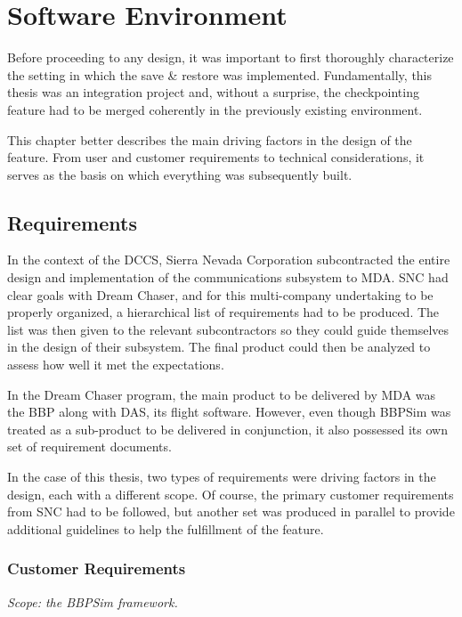 {
\setlength{\parindent}{2em}
\chapter{Software Environment}\label{cha:sim-env}
Before proceeding to any design, it was important to first thoroughly characterize the setting in which the save \& restore was implemented. Fundamentally, this thesis was an integration project and, without a surprise, the checkpointing feature had to be merged coherently in the previously existing environment.

This chapter better describes the main driving factors in the design of the feature. From user and customer requirements to technical considerations, it serves as the basis on which everything was subsequently built.

\section{Requirements}
In the context of the \gls{DCCS}, Sierra Nevada Corporation subcontracted the entire design and implementation of the communications subsystem to \gls{MDA}. \gls{SNC} had clear goals with Dream Chaser, and for this multi-company undertaking to be properly organized, a hierarchical list of requirements had to be produced. The list was then given to the relevant subcontractors so they could guide themselves in the design of their subsystem. The final product could then be analyzed to assess how well it met the expectations. 

In the Dream Chaser program, the main product to be delivered by \gls{MDA} was the \gls{BBP} along with \gls{DAS}, its flight software. However, even though \gls{BBPSim} was treated as a sub-product to be delivered in conjunction, it also possessed its own set of requirement documents.

In the case of this thesis, two types of requirements were driving factors in the design, each with a different scope. Of course, the primary customer requirements from \gls{SNC} had to be followed, but another set was produced in parallel to provide additional guidelines to help the fulfillment of the feature.  

\subsection*{Customer Requirements}
\textit{Scope: the {BBPSim} framework.}

}
